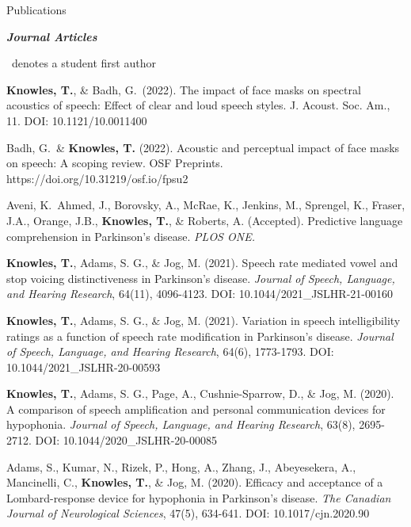 \documentclass{resume} %
\begin{document}

\begin{rSection}{Publications}

\begin{center}
	{\bf \emph{Journal Articles}}
\end{center}

\dagger\ denotes a student first author

\begin{etaremune}

	\item {\bf Knowles, T.}, & Badh, G.\dagger\ (2022). The impact of face masks on spectral acoustics of speech: Effect of clear and loud speech styles. J. Acoust. Soc. Am., 11. DOI: 10.1121/10.0011400
	
	\item Badh, G.\dagger\, & {\bf Knowles, T.} (2022). Acoustic and perceptual impact of face masks on speech: A scoping review. OSF Preprints. https://doi.org/10.31219/osf.io/fpsu2

	\item Aveni, K.\dagger\, Ahmed, J., Borovsky, A., McRae, K., Jenkins, M., Sprengel, K., Fraser, J.A., Orange, J.B., {\bf Knowles, T.}, \& Roberts, A. (Accepted). Predictive language comprehension in Parkinson’s disease. \emph{PLOS ONE.}

	\item {\bf Knowles, T.}, Adams, S. G., \& Jog, M. (2021). Speech rate mediated vowel and stop voicing distinctiveness in Parkinson's disease. \emph{Journal of Speech, Language, and Hearing Research}, 64(11), 4096-4123. DOI: 10.1044/2021\_JSLHR-21-00160

	\item {\bf Knowles, T.}, Adams, S. G., \& Jog, M. (2021). Variation in speech intelligibility ratings as a function of speech rate modification in Parkinson's disease. \emph{Journal of Speech, Language, and Hearing Research}, 64(6), 1773-1793. DOI: 10.1044/2021\_JSLHR-20-00593

	\item {\bf Knowles, T.}, Adams, S. G., Page, A., Cushnie-Sparrow, D., \& Jog, M. (2020). A comparison of speech amplification and personal communication devices for hypophonia. \emph{Journal of Speech, Language, and Hearing Research}, 63(8), 2695-2712. DOI: 10.1044/2020\_JSLHR-20-00085
	
	\item Adams, S., Kumar, N., Rizek, P., Hong, A., Zhang, J., Abeyesekera, A., Mancinelli, C., {\bf Knowles, T.}, \& Jog, M. (2020). Efficacy and acceptance of a Lombard-response device for hypophonia in Parkinson’s disease. \emph{The Canadian Journal of Neurological Sciences}, 47(5), 634-641. DOI: 10.1017/cjn.2020.90


\end{etaremune}
\end{rSection}
\end{document}
